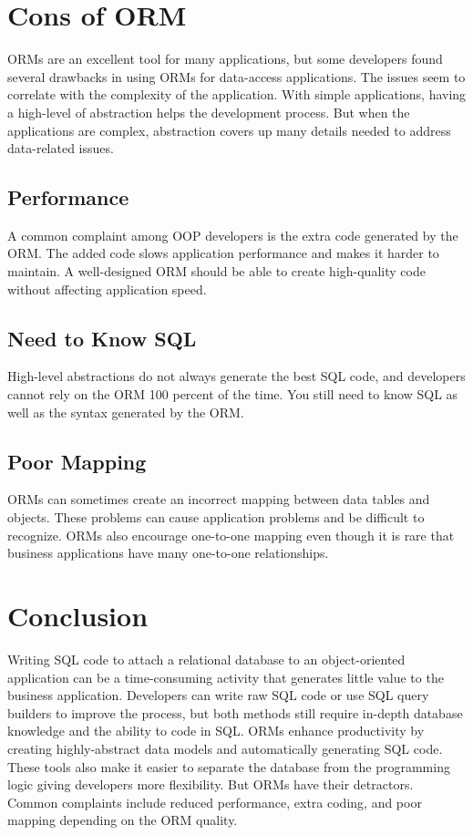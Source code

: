 \documentclass[10pt,a4paper,twoside]{article}
\begin{document}
\section{Cons of ORM}
ORMs are an excellent tool for many applications, but some developers found several drawbacks in using ORMs for data-access applications. The issues seem to correlate with the complexity of the application. With simple applications, having a high-level of abstraction helps the development process. But when the applications are complex, abstraction covers up many details needed to address data-related issues.
\subsection{Performance}
A common complaint among OOP developers is the extra code generated by the ORM. The added code slows application performance and makes it harder to maintain. A well-designed ORM should be able to create high-quality code without affecting application speed.
\subsection{Need to Know SQL}
High-level abstractions do not always generate the best SQL code, and developers cannot rely on the ORM 100 percent of the time. You still need to know SQL as well as the syntax generated by the ORM.
\subsection{Poor Mapping}
ORMs can sometimes create an incorrect mapping between data tables and objects. These problems can cause application problems and be difficult to recognize. ORMs also encourage one-to-one mapping even though it is rare that business applications have many one-to-one relationships.


\section{Conclusion}
Writing SQL code to attach a relational database to an object-oriented application can be a time-consuming activity that generates little value to the business application. Developers can write raw SQL code or use SQL query builders to improve the process, but both methods still require in-depth database knowledge and the ability to code in SQL. ORMs enhance productivity by creating highly-abstract data models and automatically generating SQL code. These tools also make it easier to separate the database from the programming logic giving developers more flexibility. But ORMs have their detractors. Common complaints include reduced performance, extra coding, and poor mapping depending on the ORM quality.
\end{document}
